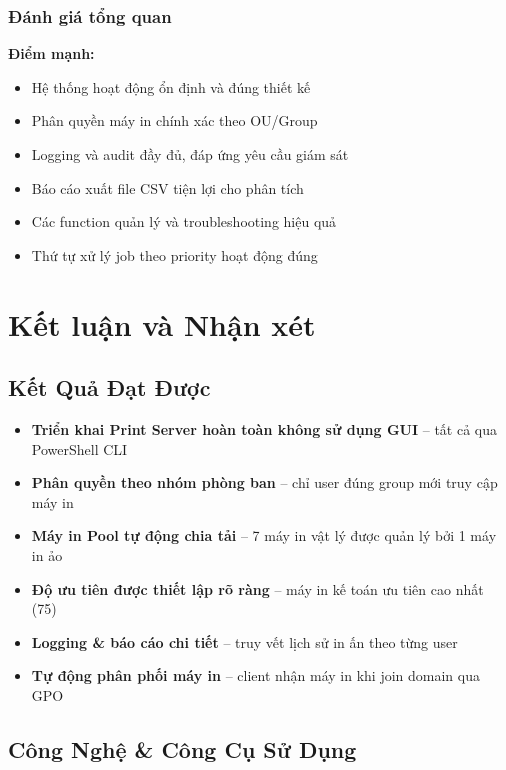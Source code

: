 \subsection{Đánh giá tổng quan}

\textbf{Điểm mạnh:}
\begin{itemize}
    \item Hệ thống hoạt động ổn định và đúng thiết kế
    \item Phân quyền máy in chính xác theo OU/Group
    \item Logging và audit đầy đủ, đáp ứng yêu cầu giám sát
    \item Báo cáo xuất file CSV tiện lợi cho phân tích
    \item Các function quản lý và troubleshooting hiệu quả
    \item Thứ tự xử lý job theo priority hoạt động đúng
\end{itemize}
\vspace{\baselineskip}

\chapter{\textbf{Kết luận và Nhận xét}}

\section{Kết Quả Đạt Được}

\begin{itemize}
    \item[\checkmark] \textbf{Triển khai Print Server hoàn toàn không sử dụng GUI} -- tất cả qua PowerShell CLI
    \item[\checkmark] \textbf{Phân quyền theo nhóm phòng ban} -- chỉ user đúng group mới truy cập máy in
    \item[\checkmark] \textbf{Máy in Pool tự động chia tải} -- 7 máy in vật lý được quản lý bởi 1 máy in ảo
    \item[\checkmark] \textbf{Độ ưu tiên được thiết lập rõ ràng} -- máy in kế toán ưu tiên cao nhất (75)
    \item[\checkmark] \textbf{Logging \& báo cáo chi tiết} -- truy vết lịch sử in ấn theo từng user
    \item[\checkmark] \textbf{Tự động phân phối máy in} -- client nhận máy in khi join domain qua GPO
\end{itemize}

\section{Công Nghệ \& Công Cụ Sử Dụng}

